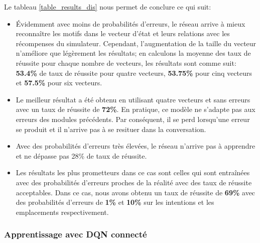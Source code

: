 Le tableau \ref{table_results_dis} nous permet de conclure ce qui suit:
\begin{itemize}
	\item Évidemment avec moins de probabilités d'erreurs, le réseau arrive à mieux reconnaître les motifs dans le vecteur d'état et leurs relations avec les récompenses du simulateur. Cependant, l'augmentation de la taille du vecteur n'améliore que légèrement les résultats; en calculons la moyenne des taux de réussite pour chaque nombre de vecteurs, les résultats sont comme suit: \textbf{53.4\%} de taux de réussite pour quatre vecteurs, \textbf{53.75\%} pour cinq vecteurs et \textbf{57.5\%} pour six vecteurs.
	\item Le meilleur résultat a été obtenu en utilisant quatre vecteurs et sans erreurs avec un taux de réussite de \textbf{72\%}. En pratique, ce modèle ne s'adapte pas aux erreurs des modules précédents. Par conséquent, il se perd lorsqu'une erreur se produit et il n'arrive pas à se resituer dans la conversation.
	\item Avec des probabilités d'erreurs très élevées, le réseau n'arrive pas à apprendre et ne dépasse pas 28\% de taux de réussite.
	\item Les résultats les plus prometteurs dans ce cas sont celles qui sont entraînées avec des probabilités d'erreurs proches de la réalité avec des taux de réussite acceptables. Dans ce cas, nous avons obtenu un taux de réussite de \textbf{69\%} avec des probabilités d'erreurs de \textbf{1\%} et \textbf{10\%} sur les intentions et les emplacements respectivement.
\end{itemize}

\subsubsection{Apprentissage avec DQN connecté}
